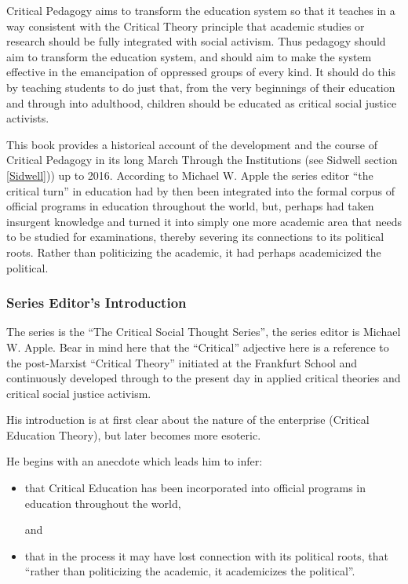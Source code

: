 \documentclass[10pt,titlepage]{book}
\begin{document}
Critical Pedagogy aims to transform the education system so that it teaches in a way consistent with the Critical Theory principle that academic studies or research should be fully integrated with social activism.
Thus pedagogy should aim to transform the education system, and should aim to make the system effective in the emancipation of oppressed groups of every kind.
It should do this by teaching students to do just that, from the very beginnings of their education and through into adulthood, children should be educated as critical social justice activists.

This book provides a historical account of the development and the course of Critical Pedagogy in its long March Through the Institutions (see Sidwell section \ref{Sidwell})) up to 2016.
According to Michael W. Apple the series editor  “the critical turn” in education had by then been integrated into the formal corpus of official programs in education throughout the world, but, perhaps had taken insurgent knowledge and turned it into simply one more academic area that needs to be studied for examinations, thereby severing its connections to its political roots.
Rather than politicizing the academic, it had perhaps academicized the political.

\subsubsection{Series Editor's Introduction}

The series is the ``The Critical Social Thought Series'', the series editor is Michael W. Apple.
Bear in mind here that the ``Critical'' adjective here is a reference to the post-Marxist ``Critical Theory'' initiated at the Frankfurt School and continuously developed through to the present day in applied critical theories and critical social justice activism.

His introduction is at first clear about the nature of the enterprise (Critical Education Theory), but later becomes more esoteric.

He begins with an anecdote which leads him to infer:

\begin{itemize}
\item that Critical Education has been incorporated into official programs in education throughout the world,

  and
\item that in the process it may have lost connection with its political roots, that ``rather than politicizing the academic, it academicizes the political''.
\end{itemize}
\end{document}
